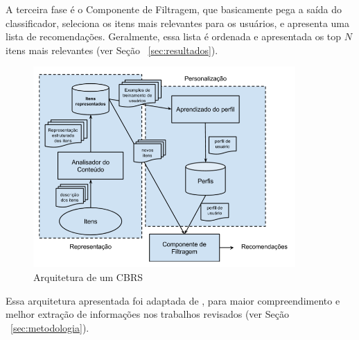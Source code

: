 \documentclass[normaltoc, espacoumemeio, pnumromarab,ruledheader]{abnt}
\begin{document}
A terceira fase é o Componente de Filtragem, que basicamente pega a saída do classificador, seleciona os itens mais relevantes para os usuários, e apresenta uma lista de recomendações. Geralmente, essa lista é ordenada e apresentada os top $N$ itens mais relevantes (ver Seção ~\ref{sec:resultados}).

\begin{figure}[h]
\centering
\includegraphics[width=100mm]{img/approach.png}
\caption{Arquitetura de um CBRS} %
\label{fig:approach}
\end{figure}

Essa arquitetura apresentada foi adaptada de \cite{Lops2011}, para maior compreendimento e melhor extração de informações nos trabalhos revisados (ver Seção ~\ref{sec:metodologia}).


\end{document}
